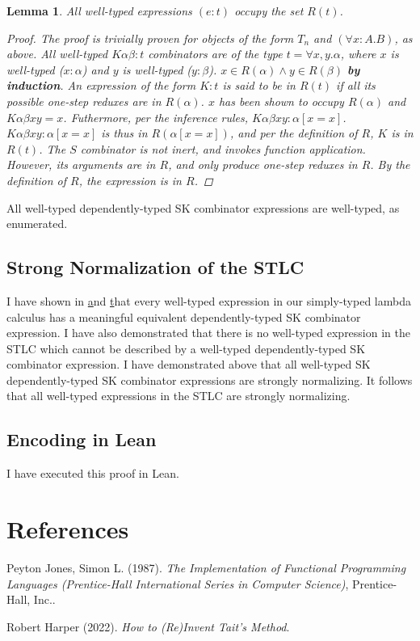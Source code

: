\documentclass[11pt]{article}
\newtheorem{lemma}[theorem]{Lemma}
\begin{document}
\begin{enumerate}
\begin{lemma}
All well-typed expressions $(e : t)$ occupy the set $R(t)$.
\begin{proof}
The proof is trivially proven for objects of the form $T_{n}$ and $(\forall x:A.B)$, as above.
All well-typed $K \alpha \beta : t$ combinators are of the type $t = \forall x, y.\alpha$, where $x$ is well-typed ($x : \alpha$) and $y$ is well-typed ($y : \beta$).
$x \in R(\alpha) \land y \in R(\beta)$ \textbf{by induction}.
An expression of the form $K : t$ is said to be in $R(t)$ if all its possible one-step reduxes are in $R(\alpha)$.
$x$ has been shown to occupy $R(\alpha)$ and $K \alpha \beta x y = x$. Futhermore, per the inference rules, $K \alpha \beta x y : \alpha[x = x]$. $K \alpha \beta x y : \alpha[x = x]$ is thus in $R(\alpha[x = x])$,
and per the definition of $R$, $K$ is in $R(t)$. The $S$ combinator is not inert, and invokes function application. However, its arguments are in $R$, and only produce one-step reduxes in $R$. By the definition of $R$, the expression is in $R$.
\end{proof}
\end{lemma}

All well-typed dependently-typed SK combinator expressions are well-typed, as enumerated.
\end{enumerate}
\subsection{Strong Normalization of the STLC}
\label{sec:org2c970ce}

I have shown in \href{decomplemma:1} and \href{maplemma:1} that every well-typed expression in our simply-typed lambda calculus has a meaningful equivalent dependently-typed SK combinator expression.
I have also demonstrated that there is no well-typed expression in the STLC which cannot be described by a well-typed dependently-typed SK combinator expression.
I have demonstrated above that all well-typed SK dependently-typed SK combinator expressions are strongly normalizing. It follows that all well-typed expressions in the STLC are strongly normalizing.
\subsection{Encoding in Lean}
\label{sec:org87d8441}

I have executed this proof in Lean.
\section{References}
\label{sec:org69c3a2d}

\noindent
Peyton Jones, Simon L. (1987). \emph{The Implementation of Functional Programming Languages (Prentice-Hall International Series in Computer Science)}, Prentice-Hall, Inc..

\noindent
Robert Harper (2022). \emph{How to (Re)Invent Tait’s Method}.
\end{document}
